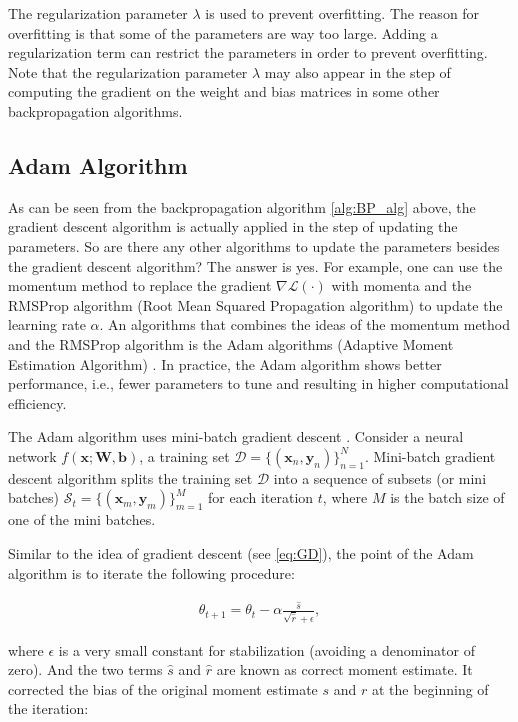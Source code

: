 \documentclass[
	parskip, 			   %
	twoside, 			   %
	DIV=14, 			   %
	BCOR=15.0mm, 		   %
	headsepline, 		   %
	open=right, 		   %
	captions=tableheading, %
	bibliography=totoc,    %
	numbers=noenddot       %
]{scrreprt}
\begin{document}
The regularization parameter $\lambda$ is used to prevent overfitting. The reason for overfitting is that some of the parameters are way too large. Adding a regularization term can restrict the parameters in order to prevent overfitting. Note that the regularization parameter $\lambda$ may also appear in the step of computing the gradient on the weight and bias matrices in some other backpropagation algorithms.

\subsection{Adam Algorithm}
As can be seen from the backpropagation algorithm \ref{alg:BP_alg} above, the gradient descent algorithm is actually applied in the step of updating the parameters. So are there any other algorithms to update the parameters besides the gradient descent algorithm? The answer is yes. For example, one can use the momentum method to replace the gradient $\nabla \mathcal{L}(\cdot)$ with momenta and the RMSProp algorithm (Root Mean Squared Propagation algorithm) \cite{tieleman2012divide} to update the learning rate $\alpha$. An algorithms that combines the ideas of the momentum method and the RMSProp algorithm is the Adam algorithms (Adaptive Moment Estimation Algorithm) \cite{kingma2014adam}. In practice, the Adam algorithm shows better performance, i.e., fewer parameters to tune and resulting in higher computational efficiency.

The Adam algorithm uses mini-batch gradient descent \cite{bottou2010large}. Consider a neural network $f(\mathbf{x};\mathbf{W},\mathbf{b})$, a training set $\mathcal{D}=\{ (\mathbf{x}_{n}, \mathbf{y}_{n}) \}_{n=1}^{N}$. Mini-batch gradient descent algorithm splits the training set $\mathcal{D}$ into a sequence of subsets (or mini batches) $\mathcal{S}_t=\{(\mathbf{x}_{m}, \mathbf{y}_{m}) \}_{m=1}^{M}$ for each iteration $t$, where $M$ is the batch size of one of the mini batches.

Similar to the idea of gradient descent (see \ref{eq:GD}), the point of the Adam algorithm is to iterate the following procedure:

\begin{equation}
    \label{eq:Adam_GD}
    \begin{aligned}
        \theta_{t+1} = \theta_{t} - \alpha \frac{\hat{s}}{\sqrt{\hat{r}} + \epsilon},
    \end{aligned}
\end{equation}

where $\epsilon$ is a very small constant for stabilization (avoiding a denominator of zero). And the two terms $\hat{s}$ and $\hat{r}$ are known as correct moment estimate. It corrected the bias of the original moment estimate $s$ and $r$ at the beginning of the iteration:
\end{document}
